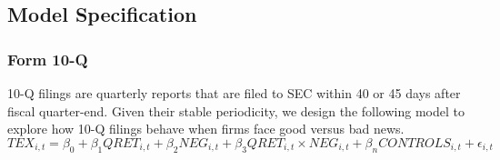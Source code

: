 \documentclass[a4paper]{article}
\begin{document}
\begin{spacing}{2}
\subsection{Model Specification}
\subsubsection{Form 10-Q}
10-Q filings are quarterly reports that are filed to SEC within 40 or 45 days after fiscal quarter-end. Given their stable periodicity, we design the following model to explore how 10-Q filings behave when firms face good versus bad news. 
\begin{equation} \label{eq1}
TEX_{i,t}=\beta_0+\beta_1QRET_{i,t}+\beta_2NEG_{i,t}+\beta_3QRET_{i,t}\times NEG_{i,t}+\beta_nCONTROLS_{i,t}+\epsilon_{i,t}
\end{equation}


\end{spacing}
\end{document}
